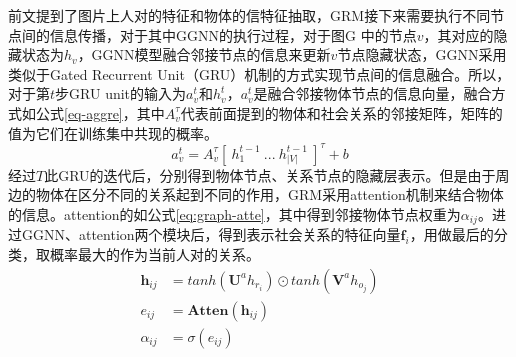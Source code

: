 前文提到了图片上人对的特征和物体的信特征抽取，GRM接下来需要执行不同节点间的信息传播，对于其中GGNN的执行过程，对于图$\mathrm{G}$ 中的节点$v$，其对应的隐藏状态为$h_{v}$，GGNN模型融合邻接节点的信息来更新$v$节点隐藏状态，GGNN采用类似于Gated Recurrent Unit（GRU）\cite{cho2014learning}机制的方式实现节点间的信息融合。所以，对于第$t$步GRU unit的输入为$a_v^t$和$h_v^t$，$a_v^t$是融合邻接物体节点的信息向量，融合方式如公式\ref{eq-aggre}，其中$A_v^{\tau}$代表前面提到的物体和社会关系的邻接矩阵，矩阵的值为它们在训练集中共现的概率。
\begin{equation}\label{eq-aggre}
    a_v^t = A_{v}^{\tau}[~h_1^{t-1}~...~h_{|V|}^{t-1}~]^{\tau} + b
\end{equation}
经过$T$此GRU的迭代后，分别得到物体节点、关系节点的隐藏层表示。但是由于周边的物体在区分不同的关系起到不同的作用，GRM采用attention机制来结合物体的信息。attention的如公式\ref{eq:graph-atte}，其中得到邻接物体节点权重为$\alpha_{ij}$。进过GGNN、attention两个模块后，得到表示社会关系的特征向量$\mathbf{f}_{i}$，用做最后的分类，取概率最大的作为当前人对的关系。
\begin{equation}\label{eq:graph-atte}
    \begin{split}
        \mathbf{h}_{ij} &= tanh(\mathbf{U}^ah_{r_{i}}) \odot tanh(\mathbf{V}^ah_{o_{j}}) \\
        e_{ij} &= \mathbf{Atten}(\mathbf{h}_{ij}) \\
        \alpha_{ij} &= \sigma(e_{ij})
    \end{split}
\end{equation}

\subsubsection{}







